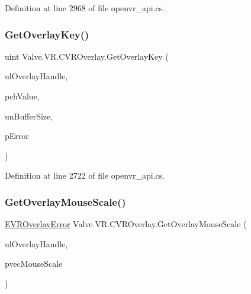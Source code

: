 Definition at line 2968 of file openvr\+\_\+api.\+cs.

\mbox{\label{class_valve_1_1_v_r_1_1_c_v_r_overlay_aa566bde97a99b71d8c98eb34b5849646}} 
\subsubsection{\texorpdfstring{GetOverlayKey()}{GetOverlayKey()}}
{\footnotesize\ttfamily uint Valve.\+V\+R.\+C\+V\+R\+Overlay.\+Get\+Overlay\+Key (\begin{DoxyParamCaption}\item[{ulong}]{ul\+Overlay\+Handle,  }\item[{System.\+Text.\+String\+Builder}]{pch\+Value,  }\item[{uint}]{un\+Buffer\+Size,  }\item[{ref \mbox{\hyperlink{namespace_valve_1_1_v_r_aaee5c5144f42b7969d45b854f51b0c18}{E\+V\+R\+Overlay\+Error}}}]{p\+Error }\end{DoxyParamCaption})}



Definition at line 2722 of file openvr\+\_\+api.\+cs.

\mbox{\label{class_valve_1_1_v_r_1_1_c_v_r_overlay_a0a5564aac6f9b1382125ee7bba858e94}} 
\subsubsection{\texorpdfstring{GetOverlayMouseScale()}{GetOverlayMouseScale()}}
{\footnotesize\ttfamily \mbox{\hyperlink{namespace_valve_1_1_v_r_aaee5c5144f42b7969d45b854f51b0c18}{E\+V\+R\+Overlay\+Error}} Valve.\+V\+R.\+C\+V\+R\+Overlay.\+Get\+Overlay\+Mouse\+Scale (\begin{DoxyParamCaption}\item[{ulong}]{ul\+Overlay\+Handle,  }\item[{ref \mbox{\hyperlink{struct_valve_1_1_v_r_1_1_hmd_vector2__t}{Hmd\+Vector2\+\_\+t}}}]{pvec\+Mouse\+Scale }\end{DoxyParamCaption})}



